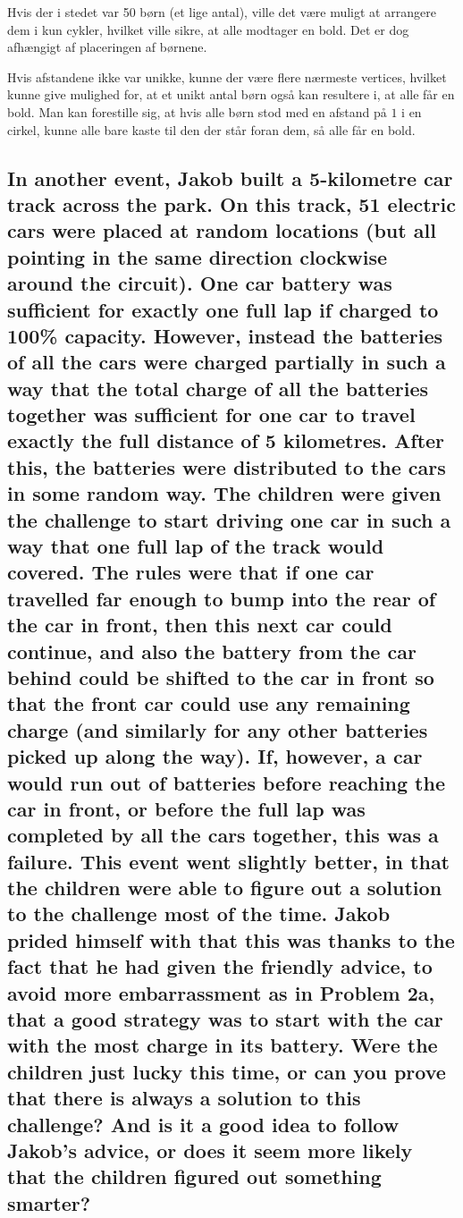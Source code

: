 \documentclass[a4paper,12pt]{article}
\begin{document}
Hvis der i stedet var 50 børn (et lige antal), ville det være muligt at arrangere dem i kun cykler, hvilket ville sikre, at alle modtager en bold. Det er dog afhængigt af placeringen af børnene.

Hvis afstandene ikke var unikke, kunne der være flere nærmeste vertices, hvilket kunne give mulighed for, at et unikt antal børn også kan resultere i, at alle får en bold. Man kan forestille sig, at hvis alle børn stod med en afstand på $1$ i en cirkel, kunne alle bare kaste til den der står foran dem, så alle får en bold.

\subsection[]{In another event, Jakob built a 5-kilometre car track across the park. On this track, 51 electric cars were placed at random locations (but all pointing in the same direction clockwise around the circuit). One car battery was sufficient for exactly one full lap if charged to 100\% capacity. However, instead the batteries of all the cars were charged partially in such a way that the total charge of all the batteries together was sufficient for one car to travel exactly the full distance of 5 kilometres. After this, the batteries were distributed to the cars in some random way. The children were given the challenge to start driving one car in such a way that one full lap of the track would covered. The rules were that if one car travelled far enough to bump into the rear of the car in front, then this next car could continue, and also the battery from the car behind could be shifted to the car in front so that the front car could use any remaining charge (and similarly for any other batteries picked up along the way). If, however, a car would run out of batteries before reaching the car in front, or before the full lap was completed by all the cars together, this was a failure. This event went slightly better, in that the children were able to figure out a solution to the challenge most of the time. Jakob prided himself with that this was thanks to the fact that he had given the friendly advice, to avoid more embarrassment as in Problem 2a, that a good strategy was to start with the car with the most charge in its battery. Were the children just lucky this time, or can you prove that there is always a solution to this challenge? And is it a good idea to follow Jakob’s advice, or does it seem more likely that the children figured out something smarter?}
\end{document}
